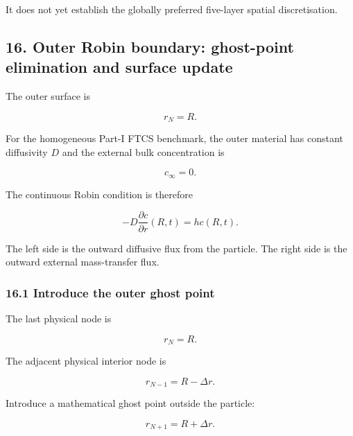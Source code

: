 \documentclass[11pt,a4paper]{article}
\begin{document}
It does not yet establish the globally preferred five-layer spatial discretisation.

\subsection*{16. Outer Robin boundary: ghost-point elimination and surface update}

The outer surface is

\begin{equation}
r_N=R.
\tag{TRISO-DIS-400}
\label{eq:triso-dis-400}
\end{equation}

For the homogeneous Part-I FTCS benchmark, the outer material has constant diffusivity $D$ and the external bulk concentration is

\begin{equation}
c_\infty=0.
\tag{TRISO-DIS-401}
\label{eq:triso-dis-401}
\end{equation}

The continuous Robin condition is therefore

\begin{equation}
-D
\frac{\partial c}{\partial r}(R,t)
=
h c(R,t).
\tag{TRISO-DIS-402}
\label{eq:triso-dis-402}
\end{equation}

The left side is the outward diffusive flux from the particle. The right side is the outward external mass-transfer flux.

\subsubsection*{16.1 Introduce the outer ghost point}

The last physical node is

\begin{equation}
r_N=R.
\tag{TRISO-DIS-403}
\label{eq:triso-dis-403}
\end{equation}

The adjacent physical interior node is

\begin{equation}
r_{N-1}=R-\Delta r.
\tag{TRISO-DIS-404}
\label{eq:triso-dis-404}
\end{equation}

Introduce a mathematical ghost point outside the particle:

\begin{equation}
r_{N+1}=R+\Delta r.
\tag{TRISO-DIS-405}
\label{eq:triso-dis-405}
\end{equation}
\end{document}
